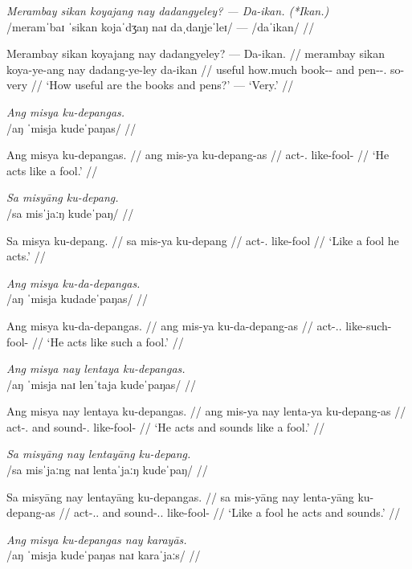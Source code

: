 \documentclass[12pt,a4paper]{scrartcl}
\newcommand{\PargI}{{\Parg}.{\Inan}}
\newcommand{\TsgM}{{\Tsg}.{\M}}
\begin{document}
\ex\begingl
\glpreamble \textit{Merambay sikan koyajang nay dadangyeley? — Da-ikan. (*Ikan.)}\\
	/meramˈbaɪ ˈsikan kojaˈdʒaŋ naɪ daˌdaŋjeˈleɪ/ — /daˈikan/ //

\gla Merambay sikan koyajang nay dadangyeley? — Da-ikan. //
\glb merambay sikan koya-ye-ang nay dadang-ye-ley {} da-ikan //
\glc useful how.much book-\Pl{}-\Aarg{} and pen-\Pl{}-\PargI{} {} so-very //
\glft `How useful are the books and pens?' — `Very.' //
\endgl\xe

\ex\begingl
\glpreamble \textit{Ang misya ku-depangas.}\\
	/aŋ ˈmisja kudeˈpaŋas/ //

\gla Ang misya ku-depangas. //
\glb ang mis-ya ku-depang-as //
\glc \AgtT{} act-\TsgM{} like-fool-\Parg{} //
\glft `He acts like a fool.' //
\endgl\xe

\ex\begingl
\glpreamble \textit{Sa misyāng ku-depang.}\\
	/sa misˈjaːŋ kudeˈpaŋ/ //

\gla Sa misya ku-depang. //
\glb sa mis-ya ku-depang //
\glc \PatT{} act-\TsgM{} like-fool //
\glft `Like a fool he acts.' //
\endgl\xe

\ex\begingl
\glpreamble \textit{Ang misya ku-da-depangas.}\\
	/aŋ ˈmisja kudadeˈpaŋas/ //

\gla Ang misya ku-da-depangas. //
\glb ang mis-ya ku-da-depang-as //
\glc \AgtT{} act-\TsgM{}.\Aarg{} like-such-fool-\Parg{} //
\glft `He acts like such a fool.' //
\endgl\xe

\ex\begingl
\glpreamble \textit{Ang misya nay lentaya ku-depangas.}\\
	/aŋ ˈmisja naɪ lenˈtaja kudeˈpaŋas/ //

\gla Ang misya nay lentaya ku-depangas. //
\glb ang mis-ya nay lenta-ya ku-depang-as //
\glc \AgtT{} act-\TsgM{} and sound-\TsgM{} like-fool-\Parg{} //
\glft `He acts and sounds like a fool.' //
\endgl\xe

\ex\begingl
\glpreamble \textit{Sa misyāng nay lentayāng ku-depang.}\\
	/sa misˈjaːng naɪ lentaˈjaːŋ kudeˈpaŋ/ //

\gla Sa misyāng nay lentayāng ku-depangas. //
\glb sa mis-yāng nay lenta-yāng ku-depang-as //
\glc \PatT{} act-\TsgM{}.\Aarg{} and sound-\TsgM{}.\Aarg{} like-fool-\Parg{} //
\glft `Like a fool he acts and sounds.' //
\endgl\xe

\ex\begingl
\glpreamble \textit{Ang misya ku-depangas nay karayās.}\\
	/aŋ ˈmisja kudeˈpaŋas naɪ karaˈjaːs/ //
\end{document}
